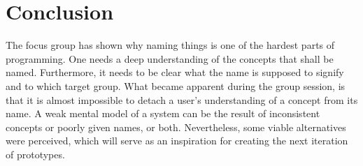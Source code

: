\section{Conclusion}
The focus group has shown why naming things is one of the hardest parts of programming. One needs a deep understanding of the concepts that shall be named. Furthermore, it needs to be clear what the name is supposed to signify and to which target group. What became apparent during the group session, is that it is almost impossible to detach a user’s understanding of a concept from its name. A weak mental model of a system can be the result of inconsistent concepts or poorly given names, or both. Nevertheless, some viable alternatives were perceived, which will serve as an inspiration for creating the next iteration of prototypes.
